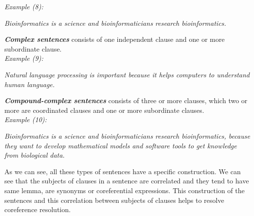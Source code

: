 \emph{Example (8):}
\begin{changemargin}{10mm}{10mm} 
  \emph{Bioinformatics is a science and bioinformaticians research bioinformatics.}
\end{changemargin} 
\vspace{3mm}
\newpage
\emph{\textbf{Complex sentences}} consists of one independent clause and one or more subordinate clause.\\

\emph{Example (9):}
\begin{changemargin}{10mm}{10mm} 
  \emph{Natural language processing is important because it helps computers to understand human language.}
\end{changemargin} 
\vspace{3mm}

\emph{\textbf{Compound-complex sentences}} consists of three or more clauses, which two or more are coordinated clauses and one or more subordinate clauses.\\

\emph{Example (10):}
\begin{changemargin}{10mm}{10mm} 
  \emph{Bioinformatics is a science and bioinformaticians research bioinformatics, because they want to develop mathematical models and software tools to get knowledge from biological data.}
\end{changemargin} 
 \vspace{3mm}
As we can see, all these types of sentences have a specific construction. We can see that the subjects of clauses in a sentence are correlated and they tend to have same lemma, are synonyms or coreferential expressions. This construction of the sentences and this correlation between subjects of clauses helps to resolve coreference resolution. 


